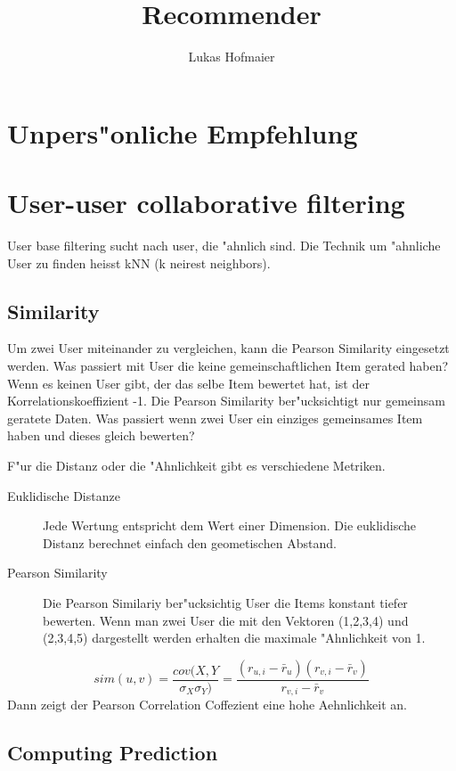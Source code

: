 \documentclass[a4paper, 11pt]{article}
\author{Lukas Hofmaier}
\title{Recommender}
\begin{document}
\maketitle

\section{Unpers"onliche Empfehlung}
\label{sec:simple}


\section{User-user collaborative filtering}
User base filtering sucht nach user, die "ahnlich sind. 
Die Technik um "ahnliche User zu finden heisst kNN (k neirest neighbors).
\subsection{Similarity}
Um zwei User miteinander zu vergleichen, kann die Pearson Similarity eingesetzt werden.
Was passiert mit User die keine gemeinschaftlichen Item gerated haben? 
Wenn es keinen User gibt, der das selbe Item bewertet hat, ist der Korrelationskoeffizient -1.
Die Pearson Similarity ber"ucksichtigt nur gemeinsam geratete Daten.
Was passiert wenn zwei User ein einziges gemeinsames Item haben und dieses gleich bewerten?

F"ur die Distanz oder die "Ahnlichkeit gibt es verschiedene Metriken. 
\begin{description}
\item[Euklidische Distanze] Jede Wertung entspricht dem Wert einer Dimension. Die euklidische Distanz berechnet einfach den geometischen Abstand.
\item[Pearson Similarity] Die Pearson Similariy ber"ucksichtig User die Items konstant tiefer bewerten. Wenn man zwei User die mit den Vektoren (1,2,3,4) und (2,3,4,5) dargestellt werden erhalten die maximale "Ahnlichkeit von 1.
\end{description}

\begin{equation}
 sim(u,v) = \frac{cov(X,Y}{\sigma_X \sigma_Y)} = \frac{(r_{u,i} - \bar{r}_u)(r_{v,i} - \bar{r}_v)}{r_{v,i} - \bar{r}_v}    
\end{equation}
Dann zeigt der Pearson Correlation Coffezient eine hohe Aehnlichkeit an.

\subsection{Computing Prediction}
\label{sec:compp}
\end{document}
